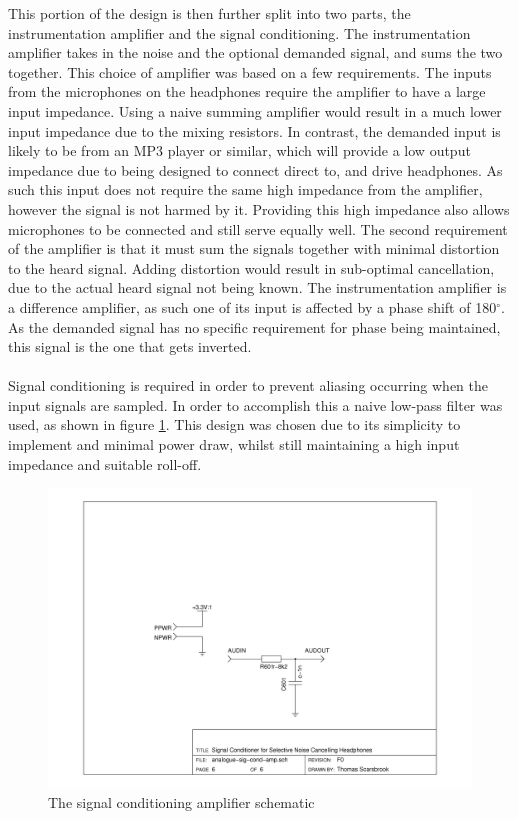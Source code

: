 \noindent This portion of the design is then further split into two parts, the instrumentation amplifier and the signal conditioning.
The instrumentation amplifier takes in the noise and the optional demanded signal, and sums the two together.
This choice of amplifier was based on a few requirements.
The inputs from the microphones on the headphones require the amplifier to have a large input impedance.
Using a naive summing amplifier would result in a much lower input impedance due to the mixing resistors.
In contrast, the demanded input is likely to be from an MP3 player or similar, which will provide a low output impedance due to being designed to connect direct to, and drive headphones.
As such this input does not require the same high impedance from the amplifier, however the signal is not harmed by it.
Providing this high impedance also allows microphones to be connected and still serve equally well.
The second requirement of the amplifier is that it must sum the signals together with minimal distortion to the heard signal.
Adding distortion would result in sub-optimal cancellation, due to the actual heard signal not being known.
The instrumentation amplifier is a difference amplifier, as such one of its input is affected by a phase shift of 180$^{\circ}$.
As the demanded signal has no specific requirement for phase being maintained, this signal is the one that gets inverted.
\\
\\
Signal conditioning is required in order to prevent aliasing occurring when the input signals are sampled.
In order to accomplish this a naive low-pass filter was used, as shown in figure \ref{fig:sigcondsch}.
This design was chosen due to its simplicity to implement and minimal power draw, whilst still maintaining a high input impedance and suitable roll-off.

\begin{figure}[H]
	\centering
	\includegraphics[width=\textwidth]{./img/analogue-sig-cond-amp.png}
	\caption{The signal conditioning amplifier schematic}
	\label{fig:sigcondsch}
\end{figure}

